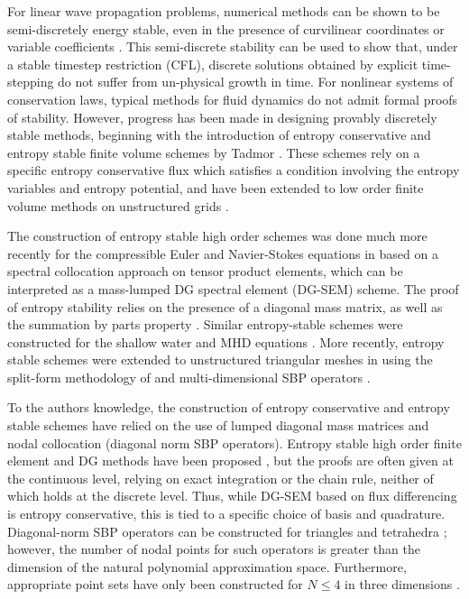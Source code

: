 \documentclass[preprint,10pt]{article}
\theoremstyle{definition}
\theoremstyle{lemma}
\theoremstyle{theorem}
\theoremstyle{assumption}
\begin{document}
For linear wave propagation problems, numerical methods can be shown to be semi-discretely energy stable, even in the presence of curvilinear coordinates or variable coefficients \cite{warburton2013low, chan2016weight1, chan2016weight2, chan2017weight}.  This semi-discrete stability can be used to show that, under a stable timestep restriction (CFL), discrete solutions obtained by explicit time-stepping do not suffer from un-physical growth in time.  For nonlinear systems of conservation laws, typical methods for fluid dynamics do not admit formal proofs of stability.  However, progress has been made in designing provably discretely stable methods, beginning with the introduction of entropy conservative and entropy stable finite volume schemes by Tadmor \cite{tadmor1987numerical, tadmor2003entropy}.   These schemes rely on a specific entropy conservative flux which satisfies a condition involving the entropy variables and entropy potential, and have been extended to low order finite volume methods on unstructured grids \cite{ray2016entropy}.  

The construction of entropy stable high order schemes was done much more recently for the compressible Euler and Navier-Stokes equations in \cite{fisher2013high, carpenter2014entropy} based on a spectral collocation approach on tensor product elements, which can be interpreted as a mass-lumped DG spectral element (DG-SEM) scheme.  The proof of entropy stability relies on the presence of a diagonal mass matrix, as well as the summation by parts property \cite{gassner2013skew}.  Similar entropy-stable schemes were constructed for the shallow water and MHD equations \cite{derigs2016novel, gassner2016well, wintermeyer2017entropy}.  More recently, entropy stable schemes were extended to unstructured triangular meshes in \cite{chen2017entropy} using the split-form methodology of \cite{gassner2016split} and multi-dimensional SBP operators \cite{hicken2016multidimensional}.  

To the authors knowledge, the construction of entropy conservative and entropy stable schemes have relied on the use of lumped diagonal mass matrices and nodal collocation (diagonal norm SBP operators).  Entropy stable high order finite element and DG methods have been proposed \cite{hughes1986new}, but the proofs are often given at the continuous level, relying on exact integration or the chain rule, neither of which holds at the discrete level.  Thus, while DG-SEM based on flux differencing is entropy conservative, this is tied to a specific choice of basis and quadrature.  Diagonal-norm SBP operators can be constructed for triangles and tetrahedra \cite{chin1999higher,  hicken2016multidimensional, chen2017entropy}; however, the number of nodal points for such operators is greater than the dimension of the natural polynomial approximation space.  Furthermore, appropriate point sets have only been constructed for $N \leq 4$ in three dimensions \cite{zhebel2014comparison}.  
\end{document}

